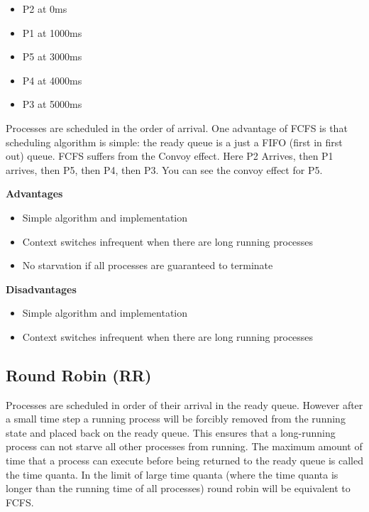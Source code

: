 \begin{itemize}
\tightlist
\item
  P2 at 0ms
\item
  P1 at 1000ms
\item
  P5 at 3000ms
\item
  P4 at 4000ms
\item
  P3 at 5000ms
\end{itemize}

Processes are scheduled in the order of arrival. One advantage of FCFS is that scheduling algorithm is simple: the ready queue is a just a FIFO (first in first out) queue. FCFS suffers from the Convoy effect. Here P2 Arrives, then P1 arrives, then P5, then P4, then P3. You can see the convoy effect for P5.

\textbf{Advantages} 

\begin{itemize}
\item Simple algorithm and implementation
\item Context switches infrequent when there are long running processes
\item No starvation if all processes are guaranteed to terminate
\end{itemize}

\textbf{Disadvantages} 
\begin{itemize}
\item Simple algorithm and implementation
\item Context switches infrequent when there are long running processes

\end{itemize}

\subsection{Round Robin (RR)}

Processes are scheduled in order of their arrival in the ready queue. However after a small time step a running process will be forcibly removed from the running state and placed back on the ready queue. This ensures that a long-running process can not starve all other processes from running. The maximum amount of time that a process can execute before being returned to the ready queue is called the time quanta. In the limit of large time quanta (where the time quanta is longer than the running time of all processes) round robin will be equivalent to FCFS.

